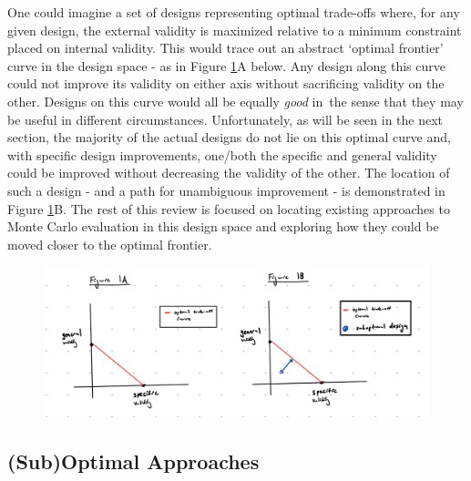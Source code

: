 \documentclass[../main.tex]{subfiles}
\begin{document}
\vspace{\baselineskip}
One could imagine a set of designs representing optimal trade-offs where, for any given design, the external validity is maximized relative to a minimum constraint placed on internal validity. This would trace out an abstract ‘optimal frontier’ curve in the design space - as in Figure \ref{fig:optimal_tradeoff_curve}A below. Any design along this curve could not improve its validity on either axis without sacrificing validity on the other. Designs on this curve would all be equally \textit{good }in\ the sense that they may be useful in different circumstances. Unfortunately, as will be seen in the next section, the majority of the actual designs do not lie on this optimal curve and, with specific design improvements, one/both the specific and general validity could be improved without decreasing the validity of the other. The location of such a design - and a path for unambiguous improvement  - is demonstrated in Figure \ref{fig:optimal_tradeoff_curve}B. The rest of this review is focused on locating existing approaches to Monte Carlo evaluation in this design space and exploring how they could be moved closer to the optimal frontier.\par


\vspace{\baselineskip}

\begin{figure}[ht!]
    \centering
    \includegraphics[width=0.9\linewidth]{figures/ch4-optimal-tradeoff-curve.png}
    \label{fig:optimal_tradeoff_curve}
\end{figure}

\par

\vspace{\baselineskip}

\subsection{(Sub)Optimal Approaches}
\end{document}
